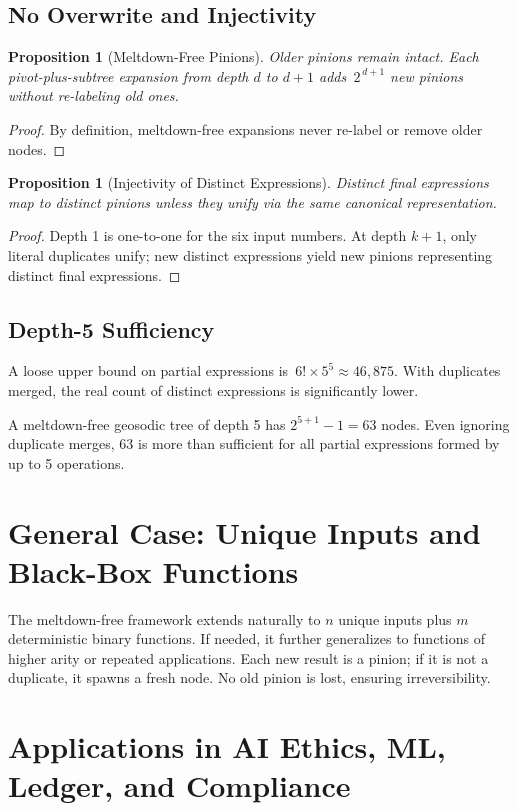 \documentclass[acmsmall]{acmart}
\newtheorem{proposition}[theorem]{Proposition}
\theoremstyle{definition}
\theoremstyle{remark}
\begin{document}
\subsection{No Overwrite and Injectivity}
\begin{proposition}[Meltdown-Free Pinions]
Older pinions remain intact. Each pivot-plus-subtree expansion from depth \(d\) to \(d+1\)
adds \(\,2^{\,d+1}\) new pinions without re-labeling old ones.
\end{proposition}
\begin{proof}
By definition, meltdown-free expansions never re-label or remove older nodes.
\end{proof}

\begin{proposition}[Injectivity of Distinct Expressions]
Distinct final expressions map to distinct pinions unless they unify via the
same canonical representation.
\end{proposition}
\begin{proof}
Depth 1 is one-to-one for the six input numbers. At depth \(k+1\), only literal
duplicates unify; new distinct expressions yield new pinions representing 
distinct final expressions.
\end{proof}

\subsection{Depth-5 Sufficiency}
\label{subsec:depth5}
A loose upper bound on partial expressions is \(\,6! \times 5^5 \approx 46{,}875\).
With duplicates merged, the real count of distinct expressions is significantly lower.

A meltdown-free geosodic tree of depth 5 has \(2^{5+1} - 1 = 63\) nodes. Even ignoring
duplicate merges, 63 is more than sufficient for all partial expressions
formed by up to 5 operations.

\section{General Case: Unique Inputs and Black-Box Functions}
\label{sec:general-case}
The meltdown-free framework extends naturally to \(n\) unique inputs plus \(m\)
deterministic binary functions. If needed, it further generalizes to functions
of higher arity or repeated applications. Each new result is a pinion; if it is
not a duplicate, it spawns a fresh node. No old pinion is lost, ensuring
irreversibility.

\section{Applications in AI Ethics, ML, Ledger, and Compliance}
\label{sec:applications}
\end{document}
